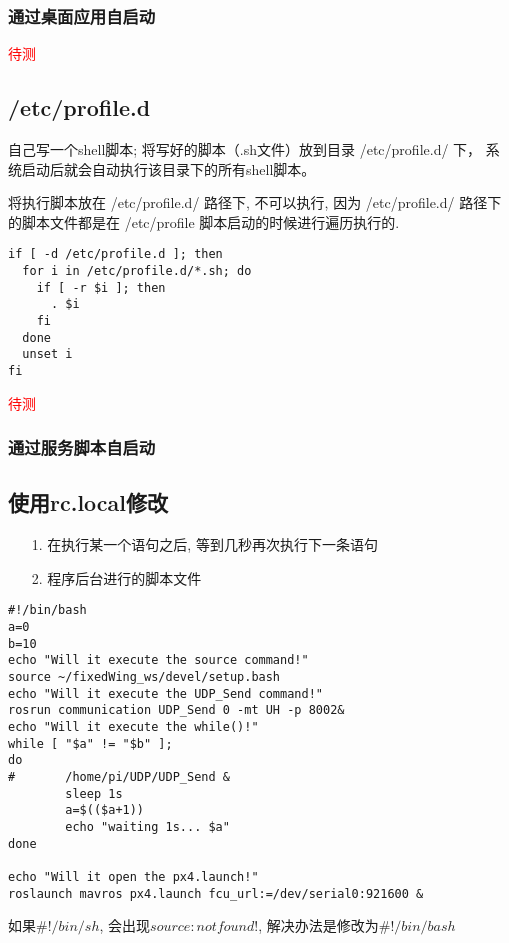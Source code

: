 


\subsubsection{通过桌面应用自启动}
    \textcolor{red}{待测}
\subsection{/etc/profile.d}
自己写一个shell脚本; 
将写好的脚本（.sh文件）放到目录 /etc/profile.d/ 下，
系统启动后就会自动执行该目录下的所有shell脚本。\par
将执行脚本放在 /etc/profile.d/ 路径下, 不可以执行, 
因为 /etc/profile.d/ 路径下的脚本文件都是在 /etc/profile 脚本启动的时候进行遍历执行的. 
\begin{lstlisting}[title=遍历执行/etc/profile.d/路径下的脚本文件]
if [ -d /etc/profile.d ]; then
  for i in /etc/profile.d/*.sh; do
    if [ -r $i ]; then
      . $i
    fi
  done
  unset i
fi

\end{lstlisting}
\textcolor{red}{待测}

\subsubsection{通过服务脚本自启动}
        

\subsection{使用rc.local修改}
\begin{itemize}
    \item [1.] 在执行某一个语句之后, 等到几秒再次执行下一条语句
    \item [2.] 程序后台进行的脚本文件
\end{itemize}
\begin{lstlisting}[title=启动脚本多ROS节点]
#!/bin/bash
a=0
b=10
echo "Will it execute the source command!"
source ~/fixedWing_ws/devel/setup.bash
echo "Will it execute the UDP_Send command!"
rosrun communication UDP_Send 0 -mt UH -p 8002&
echo "Will it execute the while()!"
while [ "$a" != "$b" ];
do
#       /home/pi/UDP/UDP_Send &
        sleep 1s
        a=$(($a+1))
        echo "waiting 1s... $a"
done

echo "Will it open the px4.launch!"
roslaunch mavros px4.launch fcu_url:=/dev/serial0:921600 &
\end{lstlisting}
如果$\#!/bin/sh$, 会出现$source:not found!$, 解决办法是修改为$\#!/bin/bash$

